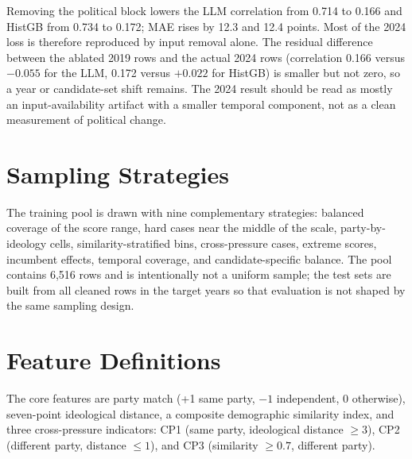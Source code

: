 Removing the political block lowers the LLM correlation from 0.714 to 0.166 and
HistGB from 0.734 to 0.172; MAE rises by 12.3 and 12.4 points. Most of the 2024
loss is therefore reproduced by input removal alone. The residual difference
between the ablated 2019 rows and the actual 2024 rows (correlation 0.166 versus
$-0.055$ for the LLM, 0.172 versus $+0.022$ for HistGB) is smaller but not zero,
so a year or candidate-set shift remains. The 2024 result should be read as
mostly an input-availability artifact with a smaller temporal component, not as
a clean measurement of political change.

\section{Sampling Strategies}

The training pool is drawn with nine complementary strategies: balanced coverage
of the score range, hard cases near the middle of the scale, party-by-ideology
cells, similarity-stratified bins, cross-pressure cases, extreme scores,
incumbent effects, temporal coverage, and candidate-specific balance. The pool
contains 6,516 rows and is intentionally not a uniform sample; the test sets are
built from all cleaned rows in the target years so that evaluation is not shaped
by the same sampling design.

\section{Feature Definitions}

The core features are party match (+1 same party, $-1$ independent, 0 otherwise),
seven-point ideological distance, a composite demographic similarity index, and
three cross-pressure indicators: CP1 (same party, ideological distance $\ge3$),
CP2 (different party, distance $\le1$), and CP3 (similarity $\ge0.7$, different
party).
